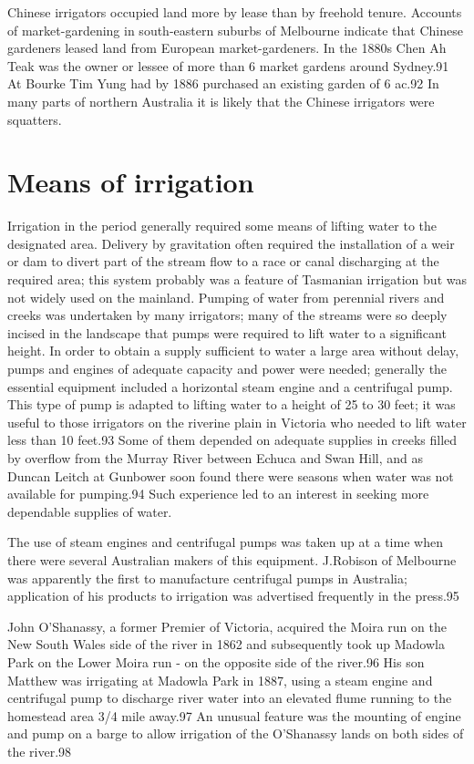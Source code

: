 Chinese irrigators occupied land more by lease than by freehold
tenure. Accounts of market-gardening in south-eastern suburbs of
Melbourne indicate that Chinese gardeners leased land from European
market-gardeners. In the 1880s Chen Ah Teak was the owner or lessee of
more than 6 market gardens around Sydney.91 At Bourke Tim Yung had by
1886 purchased an existing garden of 6 ac.92 In many parts of northern
Australia it is likely that the Chinese irrigators were squatters.

\section{Means of irrigation}

Irrigation in the period generally required some means of lifting
water to the designated area. Delivery by gravitation often required
the installation of a weir or dam to divert part of the stream flow to
a race or canal discharging at the required area; this system probably
was a feature of Tasmanian irrigation but was not widely used on the
mainland. Pumping of water from perennial rivers and creeks was
undertaken by many irrigators; many of the streams were so deeply
incised in the landscape that pumps were required to lift water to a
significant height. In order to obtain a supply sufficient to water a
large area without delay, pumps and engines of adequate capacity and
power were needed; generally the essential equipment included a
horizontal steam engine and a centrifugal pump. This type of pump is
adapted to lifting water to a height of 25 to 30 feet; it was useful
to those irrigators on the riverine plain in Victoria who needed to
lift water less than 10 feet.93 Some of them depended on adequate
supplies in creeks filled by overflow from the Murray River between
Echuca and Swan Hill, and as Duncan Leitch at Gunbower soon found
there were seasons when water was not available for pumping.94 Such
experience led to an interest in seeking more dependable supplies of
water.

The use of steam engines and centrifugal pumps was taken up at a time
when there were several Australian makers of this equipment. J.Robison
of Melbourne was apparently the first to manufacture centrifugal pumps
in Australia; application of his products to irrigation was advertised
frequently in the press.95

John O'Shanassy, a former Premier of Victoria, acquired the Moira run
on the New South Wales side of the river in 1862 and subsequently took
up Madowla Park on the Lower Moira run - on the opposite side of the
river.96 His son Matthew was irrigating at Madowla Park in 1887, using
a steam engine and centrifugal pump to discharge river water into an
elevated flume running to the homestead area 3/4 mile away.97 An
unusual feature was the mounting of engine and pump on a barge to
allow irrigation of the O'Shanassy lands on both sides of the river.98

